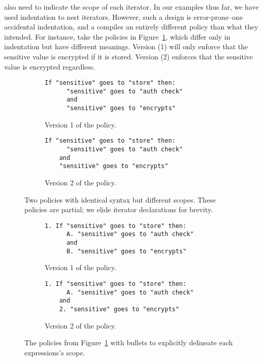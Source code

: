 \Ces{} also need to indicate the scope of each iterator.
%
In our examples thus far, we have used indentation to nest iterators.
%
However, such a design is error-prone--one accidental indentation, and a \ce{} compiles an entirely different policy than what they intended.
%
For instance, take the policies in Figure~\ref{f:indentation}, which differ only in indentation but have different meanings.
%
Version (1) will only enforce that the sensitive value is encrypted if it is stored.
%
Version (2) enforces that the sensitive value is encrypted regardless.

\begin{figure}[t]
    \begin{subfigure}[b]{\columnwidth}
  \begin{lstlisting}[language=CNL]
    If "sensitive" goes to "store" then:
      "sensitive" goes to "auth check"
      and
      "sensitive" goes to "encrypts"
  \end{lstlisting}
  \caption{Version 1 of the policy.}
  \end{subfigure}
  \begin{subfigure}[b]{\columnwidth}
  \begin{lstlisting}[language=CNL]
    If "sensitive" goes to "store" then:
      "sensitive" goes to "auth check"
    and
    "sensitive" goes to "encrypts"
    \end{lstlisting}
    \caption{Version 2 of the policy.}
    \end{subfigure}
    \caption{Two policies with identical syntax but different scopes. These policies are partial; we elide iterator declarations for brevity.}
    \label{f:indentation}
\end{figure}

\begin{figure}[t]
    \begin{subfigure}[b]{\columnwidth}
  \begin{lstlisting}[language=CNL]
    1. If "sensitive" goes to "store" then:
      A. "sensitive" goes to "auth check"
      and
      B. "sensitive" goes to "encrypts"
  \end{lstlisting}
  \caption{Version 1 of the policy.}
  \end{subfigure}
  \begin{subfigure}[b]{\columnwidth}
  \begin{lstlisting}[language=CNL]
    1. If "sensitive" goes to "store" then:
      A. "sensitive" goes to "auth check"
    and
    2. "sensitive" goes to "encrypts"
    \end{lstlisting}
    \caption{Version 2 of the policy.}
    \end{subfigure}
    \caption{The policies from Figure~\ref{f:indentation} with bullets to explicitly delineate each expressions's scope.}
    \label{f:bullets}
\end{figure}

